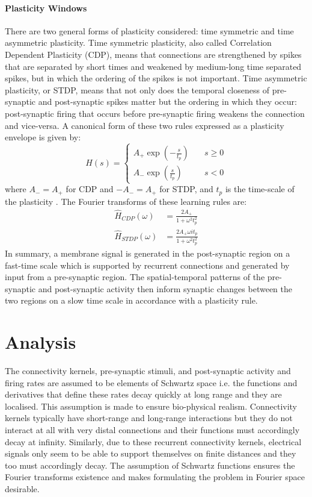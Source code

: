 \paragraph{Plasticity Windows}
There are two general forms of plasticity considered: time symmetric and time asymmetric plasticity. Time symmetric plasticity, also called Correlation Dependent Plasticity (CDP), means that connections are strengthened by spikes that are separated by short times and weakened by medium-long time separated spikes, but in which the ordering of the spikes is not important. Time asymmetric plasticity, or STDP, means that not only does the temporal closeness of pre-synaptic and post-synaptic spikes matter but the ordering in which they occur: post-synaptic firing that occurs before pre-synaptic firing weakens the connection and vice-versa. A canonical form of these two rules expressed as a plasticity envelope is given by:
\begin{equation}
	H(s) = \begin{cases}
		A_+\exp(-\frac{s}{t_p}) \quad &s\geq 0\\
		A_-\exp(\frac{s}{t_p}) \quad &s <0
	\end{cases}
\end{equation}
where $A_-=A_+$ for CDP and $-A_-=A_+$ for STDP, and $t_p$ is the time-scale of the plasticity \cite{Abbott2000-gl}. The Fourier transforms of these learning rules are:
\begin{align}
	\hat{H}_{CDP}(\omega) &= \frac{2A_+}{1+\omega^2 t_p^2} \label{rule:CDP}\\
	\hat{H}_{STDP}(\omega) &= \frac{2A_+\omega it_p}{1+\omega^2 t_p^2} \label{rule:STDP}
\end{align}
In summary, a membrane signal is generated in the post-synaptic region on a fast-time scale which is supported by recurrent connections and generated by input from a pre-synaptic region. The spatial-temporal patterns of the pre-synaptic and post-synaptic activity then inform synaptic changes between the two regions on a slow time scale in accordance with a plasticity rule.

\section{Analysis}
The connectivity kernels, pre-synaptic stimuli, and post-synaptic activity and firing rates are assumed to be elements of Schwartz space i.e. the functions and derivatives that define these rates decay quickly at long range and they are localised. This assumption is made to ensure bio-physical realism. Connectivity kernels typically have short-range and long-range interactions but they do not interact at all with very distal connections and their functions must accordingly decay at infinity. Similarly, due to these recurrent connectivity kernels, electrical signals only seem to be able to support themselves on finite distances and they too must accordingly decay. The assumption of Schwartz functions ensures the Fourier transforms existence and makes formulating the problem in Fourier space desirable.

